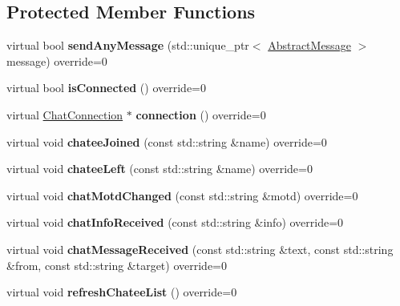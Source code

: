 \subsection*{Protected Member Functions}
\begin{DoxyCompactItemize}
\item 
\hypertarget{classSimpleChat_1_1ChatClient_a5ded6a9e1c646519402fac5d04d68859}{virtual bool {\bfseries send\-Any\-Message} (std\-::unique\-\_\-ptr$<$ \hyperlink{classSimpleChat_1_1AbstractMessage}{Abstract\-Message} $>$ message) override=0}\label{classSimpleChat_1_1ChatClient_a5ded6a9e1c646519402fac5d04d68859}

\item 
\hypertarget{classSimpleChat_1_1ChatClient_a6e715c23071858bc5c67b7146f9f18eb}{virtual bool {\bfseries is\-Connected} () override=0}\label{classSimpleChat_1_1ChatClient_a6e715c23071858bc5c67b7146f9f18eb}

\item 
\hypertarget{classSimpleChat_1_1ChatClient_a5a949c5938522983e0fee9d99fd10cb5}{virtual \hyperlink{classSimpleChat_1_1ChatConnection}{Chat\-Connection} $\ast$ {\bfseries connection} () override=0}\label{classSimpleChat_1_1ChatClient_a5a949c5938522983e0fee9d99fd10cb5}

\item 
\hypertarget{classSimpleChat_1_1ChatClient_a7284056b4774b6c04f11dc289f93805f}{virtual void {\bfseries chatee\-Joined} (const std\-::string \&name) override=0}\label{classSimpleChat_1_1ChatClient_a7284056b4774b6c04f11dc289f93805f}

\item 
\hypertarget{classSimpleChat_1_1ChatClient_a48b62cbb729cd0283f288caf6645d337}{virtual void {\bfseries chatee\-Left} (const std\-::string \&name) override=0}\label{classSimpleChat_1_1ChatClient_a48b62cbb729cd0283f288caf6645d337}

\item 
\hypertarget{classSimpleChat_1_1ChatClient_a13e625d13df8858301c14170292a9503}{virtual void {\bfseries chat\-Motd\-Changed} (const std\-::string \&motd) override=0}\label{classSimpleChat_1_1ChatClient_a13e625d13df8858301c14170292a9503}

\item 
\hypertarget{classSimpleChat_1_1ChatClient_aac3558bb326904aee565d90cbd95e2c6}{virtual void {\bfseries chat\-Info\-Received} (const std\-::string \&info) override=0}\label{classSimpleChat_1_1ChatClient_aac3558bb326904aee565d90cbd95e2c6}

\item 
\hypertarget{classSimpleChat_1_1ChatClient_ac56ed6f591d5a4843b1b0e017ed3ca2e}{virtual void {\bfseries chat\-Message\-Received} (const std\-::string \&text, const std\-::string \&from, const std\-::string \&target) override=0}\label{classSimpleChat_1_1ChatClient_ac56ed6f591d5a4843b1b0e017ed3ca2e}

\item 
\hypertarget{classSimpleChat_1_1ChatClient_a5591d713d7df3fe488c2df7b9b9d869a}{virtual void {\bfseries refresh\-Chatee\-List} () override=0}\label{classSimpleChat_1_1ChatClient_a5591d713d7df3fe488c2df7b9b9d869a}

\end{DoxyCompactItemize}
